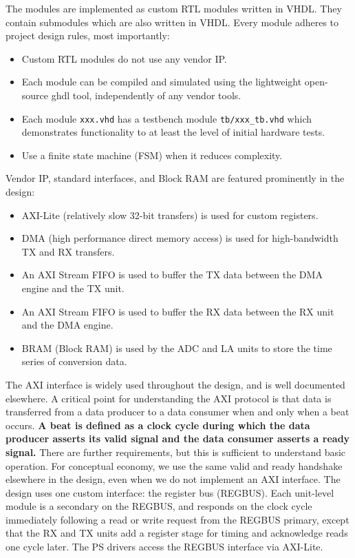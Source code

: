 \documentclass[12pt]{article}
\begin{document}
The modules are implemented as custom RTL modules written in VHDL.
They contain submodules which are also written in VHDL.  Every module
adheres to project design rules, most importantly:
\begin{itemize}
 \item Custom RTL modules do not use any vendor IP.
 \item Each module can be compiled and simulated using the lightweight open-source ghdl tool, independently of any vendor tools.
 \item Each module {\tt xxx.vhd} has a testbench module {\tt tb/xxx\_tb.vhd} which demonstrates functionality to at least the level of initial hardware tests.
 \item Use a finite state machine (FSM) when it reduces complexity.
\end{itemize}


\noindent
Vendor IP, standard interfaces, and Block RAM are featured prominently in the design:
\begin{itemize}
 \item AXI-Lite (relatively slow 32-bit transfers) is used for custom registers.
 \item DMA (high performance direct memory access) is used for high-bandwidth TX and RX transfers.
 \item An AXI Stream FIFO is used to buffer the TX data between the DMA engine and the TX unit.
 \item An AXI Stream FIFO is used to buffer the RX data between the RX unit and the DMA engine.
 \item BRAM (Block RAM) is used by the ADC and LA units to store the time series of conversion data.
\end{itemize}
The AXI interface is widely used throughout the design, and is well
documented elsewhere.  A critical point for understanding the AXI
protocol is that data is transferred from a data producer to a data
consumer when and only when a beat occurs.  {\bf A beat is defined as
  a clock cycle during which the data producer asserts its valid
  signal and the data consumer asserts a ready signal.}
There are further requirements, but this is sufficient to understand
basic operation.  For conceptual economy, we use the same valid and
ready handshake elsewhere in the design, even when we do not implement
an AXI interface.  The design uses one custom interface: the register
bus (REGBUS).  Each unit-level module is a secondary on the REGBUS,
and responds on the clock cycle immediately following a read or write
request from the REGBUS primary, except that the RX and TX units add a
register stage for timing and acknowledge reads one cycle later.  The PS drivers
access the REGBUS interface via AXI-Lite.
\end{document}
